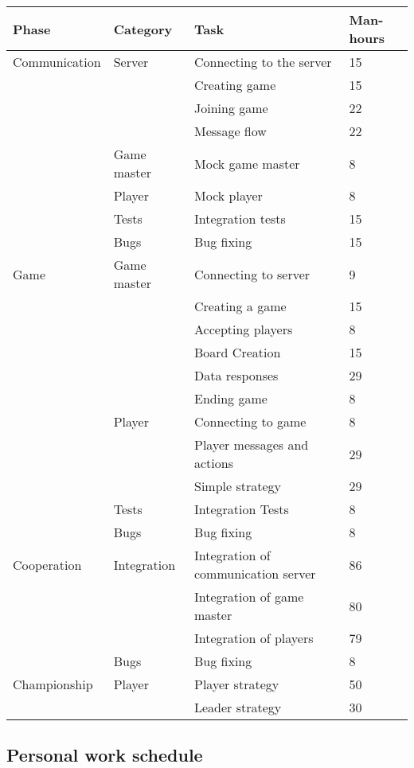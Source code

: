 \documentclass[11pt,a4paper]{article}
\begin{document}
\begin{tabular}{| p{3.5cm} | p{3cm} | p{4cm} | l |} \hline
\textbf{Phase} & \textbf{Category} & \textbf{Task} & \textbf{Man-hours} \\ \hline
Communication & Server & Connecting to the server & 15 \\ \cline{3-4}
& & Creating game & 15 \\ \cline{3-4}
& & Joining game & 22 \\ \cline{3-4}
& & Message flow & 22 \\ \cline{2-4}
& Game master & Mock game master & 8 \\ \cline{2-4}
& Player & Mock player & 8 \\ \cline{2-4}
& Tests & Integration tests & 15 \\ \cline{2-4}
& Bugs & Bug fixing & 15 \\ \hline
Game & Game master & Connecting to server & 9 \\ \cline{3-4}
& & Creating a game & 15 \\ \cline{3-4}
& & Accepting players & 8 \\ \cline{3-4}
& & Board Creation & 15 \\ \cline{3-4}
& & Data responses & 29 \\ \cline{3-4}
& & Ending game & 8 \\ \cline{2-4}
& Player & Connecting to game & 8 \\ \cline{3-4}
& & Player messages and actions & 29 \\ \cline{3-4}
& & Simple strategy & 29 \\ \cline{2-4}
& Tests & Integration Tests & 8 \\ \cline{2-4}
& Bugs & Bug fixing & 8 \\ \hline
Cooperation & Integration & Integration of communication server & 86 \\ \cline{3-4}
& & Integration of game master & 80 \\ \cline{3-4}
& & Integration of players & 79 \\ \cline{2-4}
& Bugs & Bug fixing & 8 \\ \hline
Championship & Player & Player strategy & 50 \\ \cline{3-4}
& & Leader strategy & 30 \\ \hline
\end{tabular}


\subsection{Personal work schedule}
\end{document}
